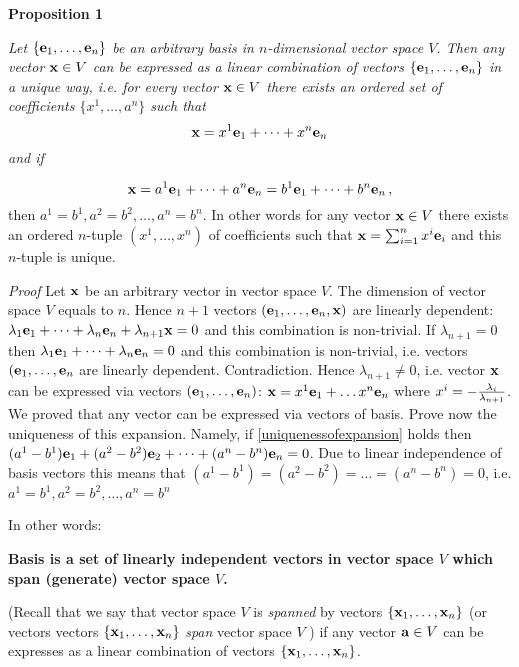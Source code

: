 \documentclass[12pt]{article}
\numberwithin{equation}{section}
\begin{document}
 {\bf Proposition 1}
 {\it Let $\{{\bf e}_1,\dots,{\bf e}_n\}$ be an arbitrary basis 
in $n$-dimensional vector space $V$.
 Then any vector ${\bf x}\in V$ can be expressed as a 
linear combination of vectors
 $\{{\bf e}_1,\dots,{\bf e}_n\}$ in a unique way, i.e.
  for every vector ${\bf x}\in V$ there exists an 
ordered set of coefficients $\{x^1,\dots,a^n\}$ such that
                            \begin{equation}\label{expansionofvector}
      {\bf x}=x^1{\bf e}_1+\dots+x^n{\bf e}_n
                            \end{equation}
 and if

                      \begin{equation}\label{uniquenessofexpansion}
      {\bf x}=a^1{\bf e}_1+\dots+a^n{\bf e}_n=b^1{\bf e}_1+\dots+b^n{\bf e}_n\,,
                            \end{equation}
 then $a^1=b^1, a^2=b^2,\dots,a^n=b^n$. In other words
for any vector ${\bf x}\in V$ there exists an ordered $n$-tuple 
$(x^1,\dots,x^n)$ of coefficients
  such that  ${\bf x}=\sum_{i=1}^nx^i{\bf e}_i$  and this 
$n$-tuple is unique.}

\m

 {\sl Proof} Let ${\bf x}$ be an arbitrary vector in vector space $V$. 
The dimension of vector space $V$
  equals to $n$. Hence $n+1$ vectors 
$({\bf e}_1,\dots,{\bf e}_n,{\bf x})$ are  linearly dependent:
  $\lambda_1{\bf e}_1+\dots+\lambda_n{\bf e}_n+\lambda_{n+1}{\bf x}=0$ 
and this combination is non-trivial.
  If $\lambda_{n+1}=0$ then  $\lambda_1{\bf e}_1+\dots+\lambda_n{\bf e}_n=0$ 
and this combination is non-trivial,
  i.e. vectors $({\bf e}_1,\dots,{\bf e}_n$ are  linearly dependent. Contradiction. Hence $\lambda_{n+1}\not=0$, i.e.
  vector ${\bf x}$ can be expressed via vectors $({\bf e}_1,\dots,{\bf e}_n)$:
                   ${\bf x}=x^1{\bf e}_1+\dots x^n{\bf e}_n$ where $x^i=-{\lambda_i\over \lambda_{n+1}}$.
  We proved that any vector can be expressed via vectors of basis. 
Prove now the uniqueness of this expansion.
Namely, if \eqref{uniquenessofexpansion} holds then
  $(a^1-b^1){\bf e}_1+(a^2-b^2){\bf e}_2+\dots+(a^n-b^n){\bf e}_n=0$. 
Due to linear independence of basis vectors
this means that $(a^1-b^1)=(a^2-b^2)=\dots=(a^n-b^n)=0$, 
i.e. $a^1=b^1, a^2=b^2,\dots,a^n=b^n$\finish


In other words:

 {\bf Basis is a set of  linearly independent
 vectors in vector space $V$ which span (generate) vector space   $V$.}

(Recall that we say that vector space $V$  is {\it spanned} by vectors $\{{\bf x}_1,\dots,{\bf x}_n\}$
(or vectors vectors $\{{\bf x}_1,\dots,{\bf x}_n\}$ {\it span} vector space $V$ ) if any vector ${\bf a}\in V$
can be expresses as a linear combination of vectors $\{{\bf x}_1,\dots,{\bf x}_n\}$.
\end{document}
